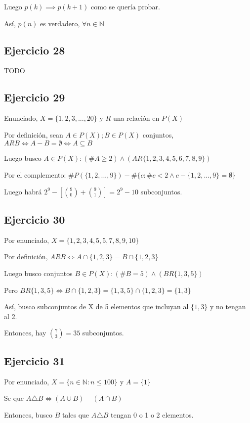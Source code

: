 Luego $ p(k) \implies p(k+1) $ como se quería probar.

Así, $ p(n) $ es verdadero, $\forall n \in \mathbb{N} $

\subsection{Ejercicio 28}
TODO

\subsection{Ejercicio 29}

Enunciado, $ X = \{ 1,2,3,...,20 \} $ y $R$ una relación en $P(X)$

Por definición, sean $A \in P(X); B \in P(X)$ conjuntos, $ ARB \iff A - B = \emptyset \iff A \subseteq B $

Luego busco $ A \in P(X): (\#A \geq 2) \wedge (AR\{ 1,2,3,4,5,6,7,8,9 \})$

Por el complemento: $ \# P(\{ 1,2,...,9 \}) - \# \{ c: \# c < 2 \wedge c-\{ 1,2,...,9 \} = \emptyset \} $

Luego habrá $ 2^9 - \left[ \binom{9}{0} + \binom{9}{1} \right] = 2^9 - 10 $ subconjuntos.

\subsection{Ejercicio 30}
Por enunciado, $ X = \{ 1,2,3,4,5,5,7,8,9,10 \} $

Por definición, $ ARB \iff A \cap \{ 1,2,3 \} = B\cap \{ 1,2,3 \} $

Luego busco conjuntos $ B \in P(X): (\#B = 5) \wedge (BR\{ 1,3,5 \})$

Pero $ BR\{ 1,3,5 \} \iff B\cap \{ 1,2,3 \} = \{ 1,3,5 \} \cap \{ 1,2,3 \} = \{ 1,3 \} $

Así, busco subconjuntos de X de 5 elementos que incluyan al $\{ 1,3 \}$ y no tengan al 2.

Entonces, hay $ \binom{7}{3} = 35 $ subconjuntos.

\subsection{Ejercicio 31}
Por enunciado, $ X = \{ n \in \mathbb{N}: n \leq 100 \} $ y $ A = \{ 1 \} $

Se que $ A \triangle B \iff (A \cup B) - (A \cap B) $

Entonces, busco $B$ tales que $ A \triangle B $ tengan 0 o 1 o 2 elementos.

